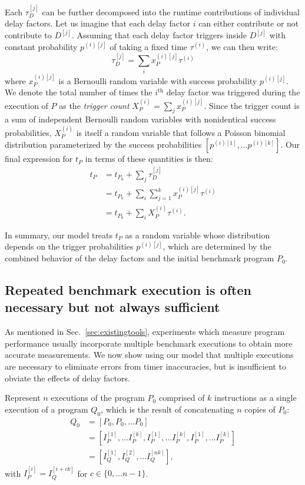 \documentclass[conference]{IEEEtran}
\begin{document}
Each $\tau^{[j]}_D$ can be further decomposed into the runtime contributions of
individual delay factors. Let us imagine that each delay factor $i$ can either
contribute or not contribute to $D^{[j]}$. Assuming that each delay factor
triggers inside $D^{[j]}$ with constant probability $p^{(i)[j]}$ of taking a
fixed time $\tau^{(i)}$, we can then write:
%
\begin{equation}
    \tau^{[j]}_D = \sum_{i} x_P^{(i)[j]} \tau^{(i)}
\end{equation}
%
where $x_P^{(i)[j]}$ is a Bernoulli random variable with success probability
$p^{(i)[j]}$. We denote the total number of times the $i^{\textrm{th}}$ delay
factor was triggered during the execution of $P$ as the \textit{trigger count}
$X_P^{(i)} = \sum_{j} x_P^{(i)[j]}$. Since the trigger count is a sum of
independent Bernoulli random variables with nonidentical success probabilities,
$X_P^{(i)}$ is itself a random variable that follows a
Poisson binomial distribution parameterized by the success probabilities
$\left[p^{(i)[1]}, \dots p^{(i)[k]}\right]$.
Our final expression for $t_P$ in terms of these quantities is then:
%
\begin{align}
t_P &= t_{P_0} + \sum_{j} \tau^{[j]}_D \nonumber \\
    &= t_{P_0} + \sum_{i} \sum_{j=1}^{k} x_P^{(i)[j]} \tau^{(i)} \nonumber \\
    &= t_{P_0} + \sum_{i} X_P^{(i)} \tau^{(i)}.
\end{align}

In summary, our model treats $t_P$ as a random variable whose distribution
depends on the trigger probabilities $p^{(i)[j]}$, which are determined by the
combined behavior of the delay factors and the initial benchmark program $P_0$.

\subsection{Repeated benchmark execution is often necessary but not always sufficient}
\label{sec:measuremodel}

As mentioned in Sec.~\ref{sec:existingtools}, experiments which measure program
performance usually incorporate multiple benchmark executions to obtain more
accurate measurements. We now show using our model that multiple executions
are necessary to eliminate errors from timer inaccuracies, but is insufficient
to obviate the effects of delay factors.

Represent $n$ executions of the program $P_0$ comprised of $k$ instructions as
a single execution of a program $Q_0$, which is the result of concatenating $n$
copies of $P_0$:
%
\begin{align}
Q_0 &= \left[P_0, P_0, \dots P_0 \right] \nonumber \\
    &= \left[I_{P}^{[1]}, \dots I_{P}^{[k]}, I_{P}^{[1]}, \dots I_{P}^{[k]}, I_{P}^{[1]}, \dots I_{P}^{[k]} \right] \nonumber \\
    &= \left[I_{Q}^{[1]}, I_{Q}^{[2]}, \dots I_{Q}^{[nk]} \right],
\end{align}
%
with $I_{P}^{[i]} = I_{Q}^{[i + ck]}$ for $c \in \{0, \dots n - 1\}$.
\end{document}
